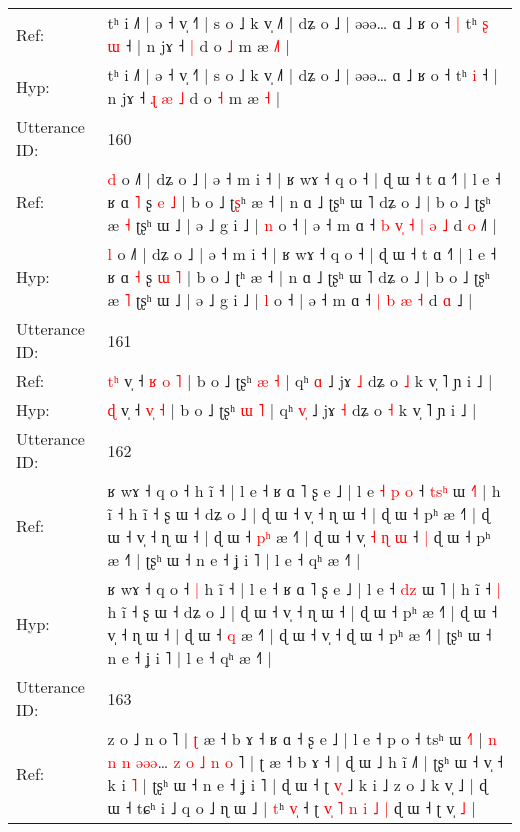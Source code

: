 \documentclass[10pt]{article}
\DeclareRobustCommand{\hl}[1]{{\textcolor{red}{#1}}}
\begin{document}
\begin{longtable}{ll}
Ref: & tʰ i ˩˥ | ə ˧ v̩ ˧˥ | s o ˩ k v̩ ˩˥ | dʑ o ˩ | əəə… ɑ ˩ ʁ o ˧\hl{ }\hl{|} tʰ\hl{ }\hl{ʂ} \hl{ɯ} ˧ | n jɤ ˧\hl{}\hl{}\hl{}\hl{} \hl{|} d o \hl{˩} m æ \hl{˩}\hl{˥} |
 \\
Hyp: & tʰ i ˩˥ | ə ˧ v̩ ˧˥ | s o ˩ k v̩ ˩˥ | dʑ o ˩ | əəə… ɑ ˩ ʁ o ˧\hl{}\hl{} tʰ\hl{}\hl{} \hl{i} ˧ | n jɤ ˧\hl{ }\hl{ɻ}\hl{ }\hl{æ} \hl{˩} d o \hl{˧} m æ \hl{}\hl{˧} |
 \\
\midrule
Utterance ID: & 160 \\
Ref: & \hl{d} o ˩˥ | dʑ o ˩ | ə ˧ m i ˧ | ʁ wɤ ˧ q o ˧ | ɖ ɯ ˧ t ɑ ˧˥ | l e ˧ ʁ ɑ \hl{˥} ʂ \hl{e} \hl{˩} | b o ˩ ʈ\hl{ʂ}ʰ æ ˧ | n ɑ ˩ ʈʂʰ ɯ ˥ dʑ o ˩ | b o ˩ ʈʂʰ æ \hl{˧} ʈʂʰ ɯ ˩ | ə ˩ g i ˩ | \hl{n} o ˧ | ə ˧ m ɑ ˧\hl{ }\hl{b}\hl{ }\hl{v}\hl{̩} \hl{˧} \hl{|} \hl{ə} \hl{˩} d \hl{o} ˩\hl{˥} |
 \\
Hyp: & \hl{l} o ˩˥ | dʑ o ˩ | ə ˧ m i ˧ | ʁ wɤ ˧ q o ˧ | ɖ ɯ ˧ t ɑ ˧˥ | l e ˧ ʁ ɑ \hl{˧} ʂ \hl{ɯ} \hl{˥} | b o ˩ ʈ\hl{}ʰ æ ˧ | n ɑ ˩ ʈʂʰ ɯ ˥ dʑ o ˩ | b o ˩ ʈʂʰ æ \hl{˥} ʈʂʰ ɯ ˩ | ə ˩ g i ˩ | \hl{l} o ˧ | ə ˧ m ɑ ˧\hl{}\hl{}\hl{}\hl{}\hl{} \hl{|} \hl{b} \hl{æ} \hl{˧} d \hl{ɑ} ˩\hl{} |
 \\
\midrule
Utterance ID: & 161 \\
Ref: & \hl{t}\hl{ʰ} v̩ ˧ \hl{ʁ}\hl{ }\hl{o} \hl{˥} | b o ˩ ʈʂʰ \hl{æ} \hl{˧} | qʰ \hl{}\hl{ɑ} ˩ jɤ \hl{˩} dʑ o \hl{˩} k v̩ ˥ ɲ i ˩ |
 \\
Hyp: & \hl{}\hl{ɖ} v̩ ˧ \hl{}\hl{v}\hl{̩} \hl{˧} | b o ˩ ʈʂʰ \hl{ɯ} \hl{˥} | qʰ \hl{v}\hl{̩} ˩ jɤ \hl{˧} dʑ o \hl{˧} k v̩ ˥ ɲ i ˩ |
 \\
\midrule
Utterance ID: & 162 \\
Ref: & ʁ wɤ ˧ q o ˧\hl{}\hl{} h ĩ ˧ | l e ˧ ʁ ɑ ˥ ʂ e ˩ | l e\hl{ }\hl{˧}\hl{ }\hl{p}\hl{ }\hl{o} ˧ \hl{t}\hl{s}\hl{ʰ} ɯ \hl{˧}˥ | h ĩ ˧\hl{}\hl{} h ĩ ˧ ʂ ɯ ˧ dʑ o ˩ | ɖ ɯ ˧ v̩ ˧ ɳ ɯ ˧ | ɖ ɯ ˧ pʰ æ ˧˥ | ɖ ɯ ˧ v̩ ˧ ɳ ɯ ˧ | ɖ ɯ ˧ \hl{p}\hl{ʰ} æ ˧˥ | ɖ ɯ ˧ v̩\hl{ }\hl{˧}\hl{ }\hl{ɳ}\hl{ }\hl{ɯ} ˧\hl{ }\hl{|} ɖ ɯ ˧ pʰ æ ˧˥ | ʈʂʰ ɯ ˧ n e ˧ ʝ i ˥ | l e ˧ qʰ æ ˧˥ |
 \\
Hyp: & ʁ wɤ ˧ q o ˧\hl{ }\hl{|} h ĩ ˧ | l e ˧ ʁ ɑ ˥ ʂ e ˩ | l e\hl{}\hl{}\hl{}\hl{}\hl{}\hl{} ˧ \hl{}\hl{d}\hl{z} ɯ \hl{}˥ | h ĩ ˧\hl{ }\hl{|} h ĩ ˧ ʂ ɯ ˧ dʑ o ˩ | ɖ ɯ ˧ v̩ ˧ ɳ ɯ ˧ | ɖ ɯ ˧ pʰ æ ˧˥ | ɖ ɯ ˧ v̩ ˧ ɳ ɯ ˧ | ɖ ɯ ˧ \hl{}\hl{q} æ ˧˥ | ɖ ɯ ˧ v̩\hl{}\hl{}\hl{}\hl{}\hl{}\hl{} ˧\hl{}\hl{} ɖ ɯ ˧ pʰ æ ˧˥ | ʈʂʰ ɯ ˧ n e ˧ ʝ i ˥ | l e ˧ qʰ æ ˧˥ |
 \\
\midrule
Utterance ID: & 163 \\
Ref: & z o ˩ n o ˥ |\hl{ }\hl{ʈ} æ ˧ b ɤ ˧\hl{}\hl{} ʁ ɑ ˧ ʂ e ˩ | l e ˧ p o ˧ tsʰ ɯ \hl{˧}\hl{˥} |\hl{ }\hl{n}\hl{ }\hl{n}\hl{ }\hl{n} \hl{ə}\hl{ə}\hl{ə}…\hl{ }\hl{z} \hl{o} \hl{˩} \hl{n} \hl{o} ˥ | ʈ æ ˧ b ɤ ˧ | ɖ ɯ ˩ h ĩ ˩˥ | ʈʂʰ ɯ ˧ v̩ ˧ k i \hl{˥} | ʈʂʰ ɯ ˧ n e ˧ ʝ i ˥ | ɖ ɯ ˧ ʈ \hl{v}\hl{̩} ˩ k i ˩ z o ˩ k v̩ ˩ | ɖ ɯ ˧ tɕʰ i ˩ q o ˩ ɳ ɯ ˩ | \hl{}\hl{t}ʰ \hl{v}\hl{̩} ˧ ʈ \hl{v}\hl{̩} \hl{˥} \hl{n} \hl{i} \hl{˩} \hl{|} ɖ ɯ ˧ ʈ v̩ \hl{}\hl{˩} |

\end{longtable}
\end{document}
